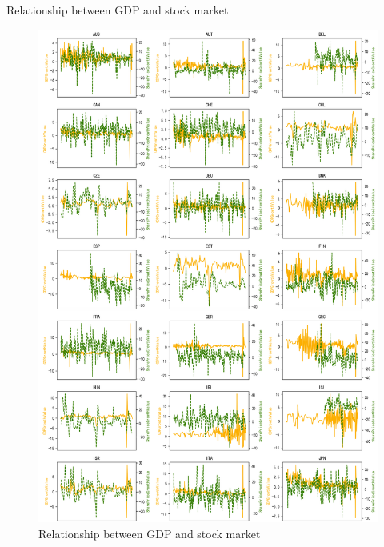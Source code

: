 \documentclass[10pt]{beamer}
\begin{document}
\begin{frame}{Relationship between GDP and stock market}
    \begin{figure}[htp]
    \centering
    \includegraphics[scale=0.2]{"OECD1"}
    \caption{Relationship between GDP and stock market}
    \label{OECD Lines 1}
    \end{figure}
\end{frame}
\end{document}
